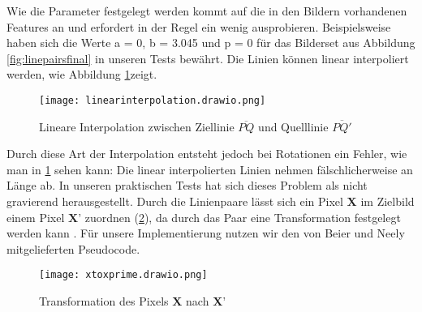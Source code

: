Wie die Parameter festgelegt werden kommt auf die in den Bildern
vorhandenen Features an und erfordert in der Regel ein wenig
ausprobieren. Beispielsweise haben sich die Werte 
a = 0, b = 3.045 und p = 0 für das Bilderset aus Abbildung
\ref{fig:linepairsfinal} in unseren Tests bewährt.
Die Linien können linear interpoliert werden, wie Abbildung \ref{fig:linearinterpolation}zeigt. 
\begin{figure}[htb]
	\centering
	\texttt{[image: linearinterpolation.drawio.png]}
	\caption{Lineare Interpolation zwischen Ziellinie $\overline{PQ}$ und Quelllinie $\overline{PQ'}$}
	\label{fig:linearinterpolation}
\end{figure}
Durch diese Art der Interpolation entsteht jedoch bei
Rotationen ein Fehler, wie man in \ref{fig:linearinterpolation} sehen kann: Die linear
interpolierten Linien nehmen fälschlicherweise
an Länge ab. In unseren praktischen Tests hat sich
dieses Problem als nicht gravierend herausgestellt. Durch die Linienpaare
lässt sich ein Pixel $\textbf{X}$ im Zielbild einem Pixel $\textbf{X'}$ zuordnen
(\ref{fig:xtoxprime}),
da durch das Paar eine Transformation festgelegt werden kann \cite{beierneely}.
Für unsere Implementierung nutzen wir den von Beier und Neely
mitgelieferten Pseudocode.

\begin{figure}[htb]
	\centering
	\texttt{[image: xtoxprime.drawio.png]}
	\caption{Transformation des Pixels $\textbf{X}$ nach $\textbf{X'}$}
	\label{fig:xtoxprime}
\end{figure}

\clearpage


